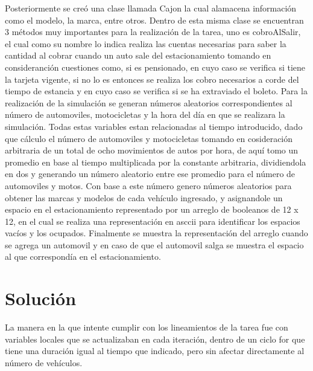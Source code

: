 \documentclass[10pt]{article}
\begin{document}
Posteriormente se creó una clase llamada Cajon la cual alamacena información como
el modelo, la marca, entre otros. 
Dentro de esta misma clase se encuentran 3 métodos muy importantes para la realización
de la tarea, uno es cobroAlSalir, el cual como su nombre lo indica realiza las cuentas
necesarias para saber la cantidad al cobrar cuando un auto sale del estacionamiento 
tomando en consideranción cuestiones como, si es pensionado, en cuyo caso se verifica
si tiene la tarjeta vigente, si no lo es entonces se realiza los cobro necesarios 
a corde del tiempo de estancia y en cuyo caso se verifica si se ha extraviado el boleto.
Para la realización de la simulación se generan números aleatorios correspondientes al
número de automoviles, motocicletas y la hora del día en que se realizara la simulación.
Todas estas variables estan relacionadas al tiempo introducido, dado que cálculo el número de automoviles y motocicletas tomando en cosideración arbitraria de un total de ocho movimientos de autos por hora, de aquí tomo un promedio en base al tiempo multiplicada por la constante arbitraria, dividiendola en dos y generando un número aleatorio entre ese promedio para el número de automoviles y motos.
Con base a este número genero números aleatorios para obtener las marcas y modelos de cada vehículo ingresado, y asignandole un espacio en el estacionamiento representado por un arreglo de booleanos de 12 x 12, en el cual se realiza una representación en asccii para identificar los espacios vacíos y los ocupados.
Finalmente se muestra la representación del arreglo cuando se agrega un automovil y en caso de que el automovil salga se muestra el espacio al que correspondía en el estacionamiento.

\section{Solución }

La manera en la que intente cumplir con los lineamientos de la tarea fue con variables locales que se actualizaban en cada iteración, dentro de un ciclo for que tiene una duración igual al tiempo que indicado, pero sin afectar directamente al número de vehículos.
\end{document}
